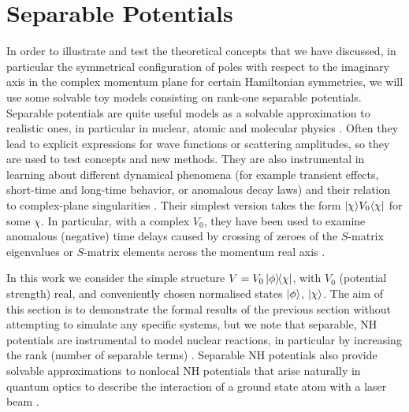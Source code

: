 \section{Separable Potentials}
\label{sec:chapter2_separablePotentials}
%
%
In order to illustrate and test the theoretical concepts that we have discussed, in particular the
symmetrical configuration of poles with respect to the imaginary axis in the complex momentum plane for certain Hamiltonian symmetries, we will use some solvable toy models consisting on rank-one separable potentials.
Separable potentials are quite useful models as a solvable approximation to realistic ones, in particular in nuclear, atomic and molecular physics \cite{Popov2019}.
Often they lead to explicit expressions
for wave functions or scattering amplitudes, so they are used to test concepts and new methods.
They are also instrumental in learning about different dynamical phenomena (for example transient effects, short-time and long-time behavior, or anomalous decay laws)  and their relation to complex-plane singularities
\cite{Muga1990,Muga1996,Muga1996a,Muga1998}. Their simplest version takes the form
$|\chi\rangle V_0\langle\chi|$ for some  $\chi$.   In particular, with a complex $V_0$,
they have been used to examine anomalous (negative) time delays caused by  crossing of zeroes of the $S$-matrix eigenvalues or $S$-matrix elements across the momentum real axis \cite{Muga1998a}.

In this work we consider the simple structure
$V=V_0 \ketbra{\phi}{\chi}$, with $V_0$ (potential strength) real, and conveniently chosen normalised states $\ket{\phi}$, $\ket{\chi}$.
The aim of this section is to demonstrate the formal results of the previous section without attempting to simulate any specific systems, but we note that separable, NH potentials are instrumental to model nuclear reactions, in particular  by increasing the rank (number of separable terms) \cite{Hlophe2017}.
Separable NH potentials also provide solvable approximations to nonlocal NH potentials that arise naturally in quantum optics to describe the interaction of a ground state atom with a laser beam \cite{Ruschhaupt2004a}.

